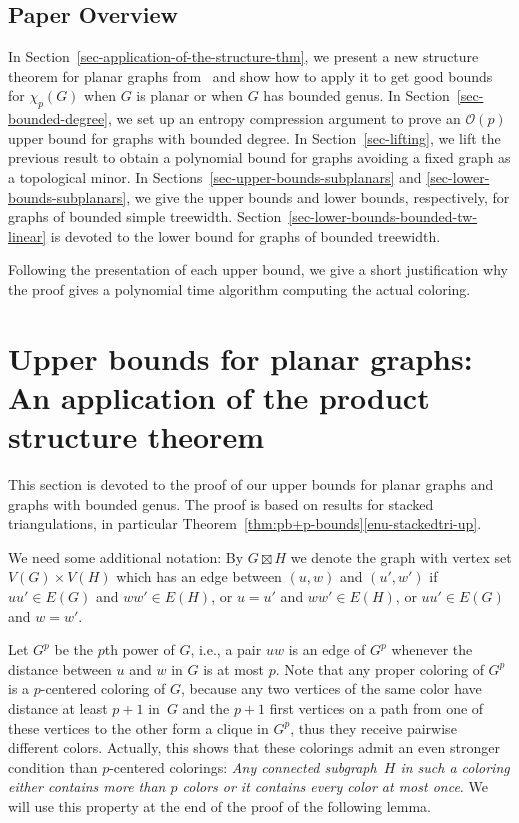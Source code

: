 \documentclass[11pt]{article}
\begin{document}
\subsection{Paper Overview}  In
Section~\ref{sec-application-of-the-structure-thm}, we present a new structure
theorem for planar graphs from~\cite{DJMMUW-queues} and show how to apply it
to get good bounds for $\chi_p(G)$ when $G$ is planar or when $G$ has bounded
genus.  In Section~\ref{sec-bounded-degree}, we set up an entropy compression
argument to prove an $\mathcal{O}(p)$ upper bound for graphs with bounded degree.  In
Section~\ref{sec-lifting}, we lift the previous result to obtain a polynomial
bound for graphs avoiding a fixed graph as a topological minor.  In
Sections~\ref{sec-upper-bounds-subplanars} and
\ref{sec-lower-bounds-subplanars}, we give the upper bounds and lower bounds,
respectively, for graphs of bounded simple treewidth.
Section~\ref{sec-lower-bounds-bounded-tw-linear} is devoted to the lower bound
for graphs of bounded treewidth.

Following the presentation of each upper bound, we give a short justification 
why the proof gives a polynomial time algorithm computing the actual coloring.

\section{Upper bounds for planar graphs: An application of the product
structure theorem}
\label{sec-product-structure}\label{sec-application-of-the-structure-thm}

This section is devoted to the proof of our upper bounds for planar graphs and
graphs with bounded genus. The proof is based on results for stacked
triangulations, in particular Theorem~\ref{thm:pb+p-bounds}\ref{enu-stackedtri-up}.

We need some additional notation: By $G\boxtimes H$ we denote the graph with
vertex set $V(G)\times V(H)$ which has an edge between $(u,w)$ and $(u',w')$
if $uu'\in E(G)$ and $ww'\in E(H)$, or $u=u'$ and $ww'\in E(H)$, or $uu'\in E(G)$ and $w=w'$.

Let $G^p$ be the $p$th power of $G$, i.e., a pair $uw$ is an edge of $G^p$ whenever the distance
between $u$ and $w$ in $G$ is at most $p$. Note that any proper coloring of $G^p$  is a $p$-centered 
coloring of $G$, because any two vertices of the same color have distance at least $p+1$ in~$G$
and the $p+1$ first vertices on a path from one of these vertices to the other form a clique in
$G^p$, thus they receive pairwise different colors. Actually, this shows that these colorings admit an
even stronger condition than $p$-centered colorings: \emph{Any connected subgraph~$H$ in such a
coloring either contains more than $p$ colors or it contains every color at most once}.
We will use this property at the end of the proof of the following lemma.
\end{document}
